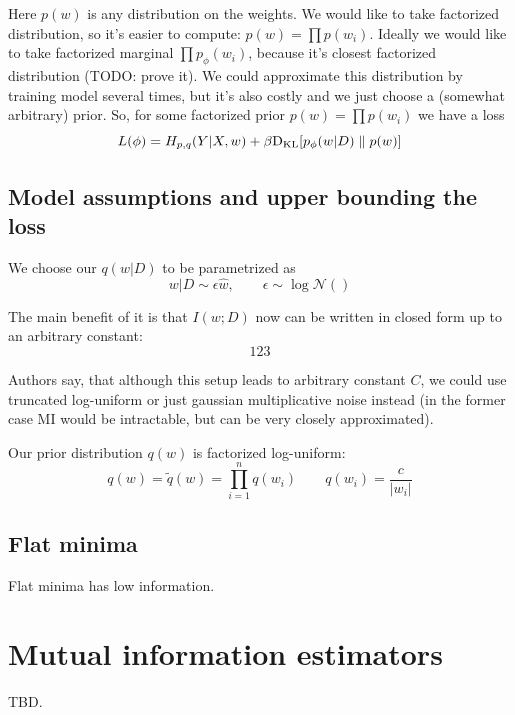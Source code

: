 \documentclass{article}
\begin{document}
Here $p(w)$ is any distribution on the weights.
We would like to take factorized distribution, so it's easier to compute: $p(w) = \prod p(w_i)$.
Ideally we would like to take factorized marginal $\prod p_\phi(w_i)$, because it's closest factorized distribution (TODO: prove it).
We could approximate this distribution by training model several times, but it's also costly and we just choose a (somewhat arbitrary) prior.
So, for some factorized prior $p(w) = \prod p(w_i)$ we have a loss
\[
L(\phi) = H_{p,q}(Y|X,w) + \beta \text{D}_\text{KL}[p_\phi(w|D) \parallel p(w)]
\]

\subsection*{Model assumptions and upper bounding the loss}
We choose our $q(w|D)$ to be parametrized as
\[
w|D \sim \epsilon \hat{w}, \qquad \epsilon \sim \log \mathcal{N}()
\]

The main benefit of it is that $I(w;D)$ now can be written in closed form up to an arbitrary constant:
\[
123
\]

Authors say, that although this setup leads to arbitrary constant $C$, we could use truncated log-uniform or just gaussian multiplicative noise instead (in the former case MI would be intractable, but can be very closely approximated).

Our prior distribution $q(w)$ is factorized log-uniform:
\[
q(w) = \tilde{q}(w) = \prod_{i=1}^n q(w_i) \qquad q(w_i) = \frac{c}{|w_i|}
\]

\subsection*{Flat minima}
\begin{theorem}
Flat minima has low information.
\end{theorem}


\section{Mutual information estimators}
TBD.
%
%
%
\end{document}
